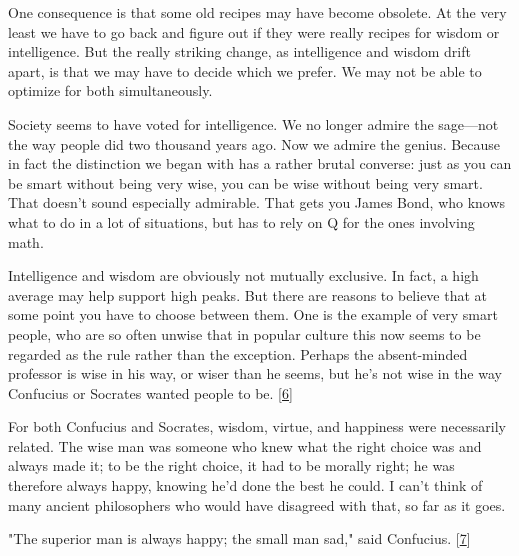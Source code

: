 One consequence is that some old recipes
                  may have become obsolete. At the very least we have to go back
                  and figure out if they were really recipes for wisdom or
                  intelligence. But the really striking change, as intelligence
                  and wisdom drift apart, is that we may have to decide which we
                  prefer. We may not be able to optimize for both
                  simultaneously.

Society seems to have voted for
                  intelligence. We no longer admire the sage---not the way
                  people did two thousand years ago. Now we admire the genius.
                  Because in fact the distinction we began with has a rather
                  brutal converse: just as you can be smart without being very
                  wise, you can be wise without being very smart. That doesn't
                  sound especially admirable. That gets you James Bond, who
                  knows what to do in a lot of situations, but has to rely on Q
                  for the ones involving math.

Intelligence and
                  wisdom are obviously not mutually exclusive. In fact, a high
                  average may help support high peaks. But there are reasons to
                  believe that at some point you have to choose between them.
                  One is the example of very smart people, who are so often
                  unwise that in popular culture this now seems to be regarded
                  as the rule rather than the exception. Perhaps the
                  absent-minded professor is wise in his way, or wiser than he
                  seems, but he's not wise in the way Confucius or Socrates
                  wanted people to be.
                  [\href{\#f6n}{6}]

For both Confucius and
                  Socrates, wisdom, virtue, and happiness were necessarily
                  related. The wise man was someone who knew what the right
                  choice was and always made it; to be the right choice, it had
                  to be morally right; he was therefore always happy, knowing
                  he'd done the best he could. I can't think of many ancient
                  philosophers who would have disagreed with that, so far as it
                  goes.

"The superior man is always happy; the small
                  man sad," said Confucius.
                  [\href{\#f7n}{7}]

